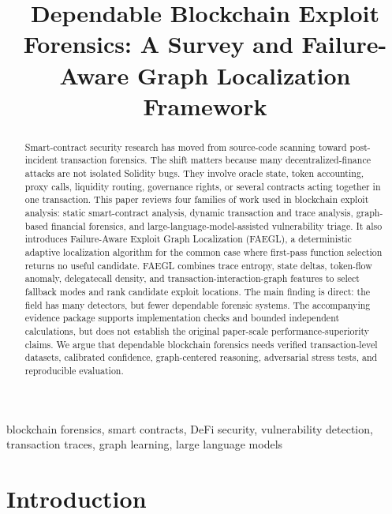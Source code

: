 \documentclass[conference]{IEEEtran}
\begin{document}
\title{Dependable Blockchain Exploit Forensics: A Survey and Failure-Aware Graph Localization Framework}

\author{
}

\maketitle

\begin{abstract}
Smart-contract security research has moved from source-code scanning toward post-incident transaction forensics. The shift matters because many decentralized-finance attacks are not isolated Solidity bugs. They involve oracle state, token accounting, proxy calls, liquidity routing, governance rights, or several contracts acting together in one transaction. This paper reviews four families of work used in blockchain exploit analysis: static smart-contract analysis, dynamic transaction and trace analysis, graph-based financial forensics, and large-language-model-assisted vulnerability triage. It also introduces Failure-Aware Exploit Graph Localization (FAEGL), a deterministic adaptive localization algorithm for the common case where first-pass function selection returns no useful candidate. FAEGL combines trace entropy, state deltas, token-flow anomaly, delegatecall density, and transaction-interaction-graph features to select fallback modes and rank candidate exploit locations. The main finding is direct: the field has many detectors, but fewer dependable forensic systems. The accompanying evidence package supports implementation checks and bounded independent calculations, but does not establish the original paper-scale performance-superiority claims. We argue that dependable blockchain forensics needs verified transaction-level datasets, calibrated confidence, graph-centered reasoning, adversarial stress tests, and reproducible evaluation.
\end{abstract}

\begin{IEEEkeywords}
blockchain forensics, smart contracts, DeFi security, vulnerability detection, transaction traces, graph learning, large language models
\end{IEEEkeywords}

\section{Introduction}
\end{document}
